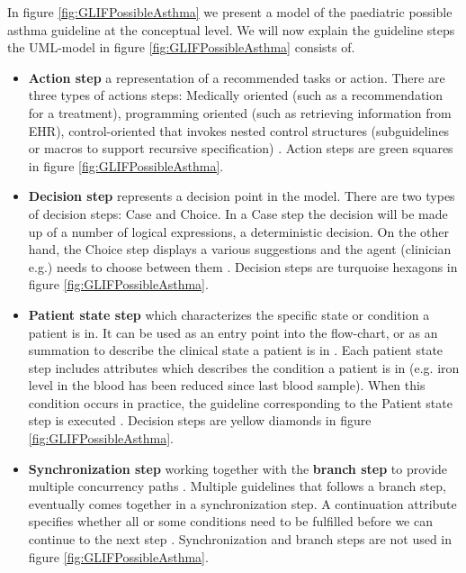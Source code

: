 \begin{itemize}
	In figure \ref{fig:GLIFPossibleAsthma} we present a model of the paediatric possible asthma guideline \parencite{RepublicofKeny2016} at the conceptual level. We will now explain the guideline steps the UML-model in figure \ref{fig:GLIFPossibleAsthma} consists of.
	\begin{itemize}
		\item \textbf{Action step} a representation of a recommended tasks or action. There are three types of actions steps: Medically oriented (such as a recommendation for a treatment), programming oriented (such as retrieving information from EHR), control-oriented that invokes nested control structures (subguidelines or macros to support recursive specification) \parencite{DeClercq2008}. Action steps are green squares in figure \ref{fig:GLIFPossibleAsthma}.
		\item \textbf{Decision step} represents a decision point in the model. There are two types of decision steps: Case and Choice. In a Case step the decision will be made up of a number of logical expressions, a deterministic decision. On the other hand, the Choice step displays a various suggestions and the agent (clinician e.g.) needs to choose between them \parencite{DeClercq2008}. Decision steps are turquoise hexagons in figure \ref{fig:GLIFPossibleAsthma}.
		\item \textbf{Patient state step} which characterizes the specific state or condition a patient is in. It can	be used as an entry point into the 
flow-chart, or as an summation to describe the clinical state a patient is in \parencite{Boxwala2004}. Each patient state step includes attributes which describes the condition a patient is in (e.g. iron level in the blood has been reduced since last blood sample). When this condition occurs in practice, the guideline corresponding	to the Patient state step is executed \parencite{DeClercq2008}. Decision steps are yellow diamonds in figure \ref{fig:GLIFPossibleAsthma}.
		\item \textbf{Synchronization step} working together with the \textbf{branch step} to provide multiple concurrency paths \parencite{Boxwala2004}. Multiple guidelines that follows a branch step, eventually comes together in a synchronization step. A continuation attribute specifies	whether all or some conditions need to be fulfilled before we can continue to the next step \parencite{DeClercq2008}. Synchronization and branch steps are not used in figure \ref{fig:GLIFPossibleAsthma}.
	\end{itemize}
	 

\end{itemize}
